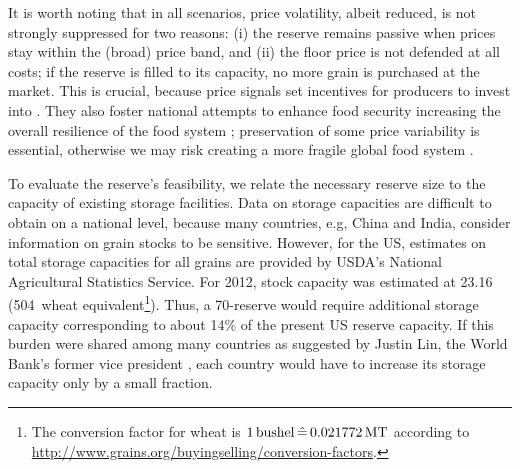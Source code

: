 \documentclass[12pt]{article}
\begin{document}
It is worth noting that in all scenarios, price volatility, albeit reduced, is not strongly suppressed for two reasons: (i) the reserve remains passive when prices stay within the (broad) price band, and (ii) the floor price is not defended at all costs; if the reserve is filled to its capacity, no more grain is purchased at the market. This is crucial, because price signals set incentives for producers to invest into \RD. They also foster national attempts to enhance food security increasing the overall resilience of the food system \cite{HLPE11}; preservation of some price variability is essential, otherwise we may risk creating a more fragile global food system \cite{TAL12}.

To evaluate the reserve's feasibility, we relate the necessary reserve size to the capacity of existing storage facilities. Data on storage capacities are difficult to obtain on a national level, because many countries, e.g, China and India, consider information on grain stocks to be sensitive. However, for the US, estimates on total storage capacities for all grains are provided by USDA's National Agricultural Statistics Service. For 2012, stock capacity was estimated at 23.16\bnbushels \cite{NASS14} (504\mmt~wheat equivalent\footnote{The conversion factor for wheat is
  $1\bushel\, \hat{=}\, 0.021772\Mt$ according to
  \url{http://www.grains.org/buyingselling/conversion-factors}.}). Thus, a 70\mmt-reserve would require additional storage capacity corresponding to about 14\% of the present US reserve capacity. If this burden were shared among many countries as suggested by Justin Lin, the World Bank's former vice president \cite{LIN08}, each country would have to increase its storage capacity only by a small fraction.
\end{document}
